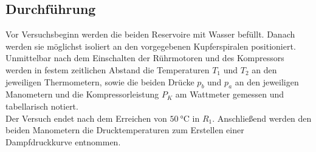 \subsection{Durchführung}
Vor Versuchsbeginn werden die beiden Reservoire mit %
Wasser befüllt.
Danach werden sie möglichst isoliert an den vorgegebenen Kupferspiralen positioniert.
Unmittelbar nach dem Einschalten der Rührmotoren und des Kompressors werden in festem zeitlichen Abstand die Temperaturen $T_1$ und $T_2$ an den jeweiligen Thermometern, sowie die beiden Drücke $ p_b $ und $ p_a $ an den jeweiligen Manometern und die Kompressorleistung $ P_K $ am Wattmeter gemessen und tabellarisch notiert.\\
Der Versuch endet nach dem Erreichen von $ \SI{50}{\celsius} $ in $ R_1 $.
Anschließend werden den beiden Manometern die Drucktemperaturen zum Erstellen einer Dampfdruckkurve entnommen.
\label{sec:Durchführung}
